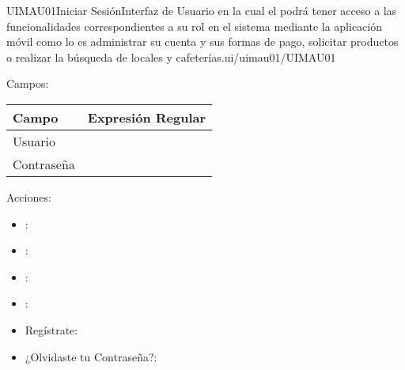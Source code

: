 
\begin{UI}[0.3]{UIMAU01}{Iniciar Sesión}{Interfaz de Usuario en la cual el  podrá tener acceso a las funcionalidades correspondientes a su rol en el sistema mediante la aplicación móvil como lo es administrar su cuenta y sus formas de pago, solicitar productos o realizar la búsqueda de locales y cafeterías.}{ui/uimau01/UIMAU01}
	\item[Campos:]\hspace{0.1pt}
		\begin{center}
			\begin{longtable}{|p{}|p{}|}
				\hline
					\bf Campo & \bf Expresión Regular\\
					\hline
					Usuario & \\
					\hline
					Contraseña & \\
					\hline
			\end{longtable}
		\end{center}
	\item[Acciones:]\hspace{0.1pt}
		\begin{itemize}
			\item {}:
			\item {}:
			\item {}:
			\item {}:
			\item Regístrate:
			\item ¿Olvidaste tu Contraseña?:
		\end{itemize}

\end{UI}